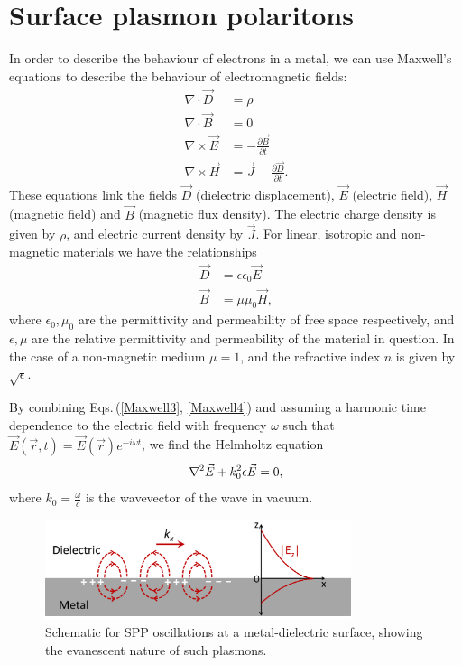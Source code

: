 \section{Surface plasmon polaritons}
In order to describe the behaviour of electrons in a metal, we can use Maxwell's equations to describe the behaviour of electromagnetic fields:
\begin{subequations}
\label{Maxwell}
\begin{align}
\nabla \cdot \vec{D} &= \rho \label{Maxwell1}\\
\nabla \cdot \vec{B} &= 0 \label{Maxwell2}\\
\nabla \times \vec{E} &= - \frac{\partial \vec{B}}{\partial t} \label{Maxwell3}\\
\nabla \times \vec{H} &= \vec{J} + \frac{\partial \vec{D}}{\partial t} \label{Maxwell4}. 
\end{align}
\end{subequations}
These equations link the fields $\vec{D}$ (dielectric displacement), $\vec{E}$ (electric field), $\vec{H}$ (magnetic field) and $\vec{B}$ (magnetic flux density). The electric charge density is given by $\rho$, and electric current density by $\vec{J}$. For linear, isotropic and non-magnetic materials we have the relationships
\begin{subequations}
\label{fieldrelations}
\begin{align}
\vec{D} &= \epsilon \epsilon_0 \vec{E} \label{DE}\\
\vec{B} &= \mu \mu_0 \vec{H} \label{BH},
\end{align}
\end{subequations}
where $\epsilon_0, \mu_0$ are the permittivity and permeability of free space respectively, and $\epsilon, \mu$ are the relative permittivity and permeability of the material in question. In the case of a non-magnetic medium $\mu=1$, and the refractive index $n$ is given by $\sqrt{\epsilon}$.

By combining Eqs.\,(\ref{Maxwell3}, \ref{Maxwell4}) and assuming a harmonic time dependence to the electric field with frequency $\omega$ such that $\vec{E}(\vec{r},t) = \vec{E}(\vec{r})e^{-i\omega t}$, we find the Helmholtz equation
\begin{equation}
\centering
\nabla^2\vec{E} + k_0^2\epsilon \vec{E} = 0,
\label{Helmholz}
\end{equation}
where $k_0 = \frac{\omega}{c}$ is the wavevector of the wave in vacuum.
\begin{figure}[ht] 
\centering    
\includegraphics[width=0.8\textwidth]{Fig1}
\caption{Schematic for SPP oscillations at a metal-dielectric surface, showing the evanescent nature of such plasmons.}
\label{3Fig1}
\end{figure}

